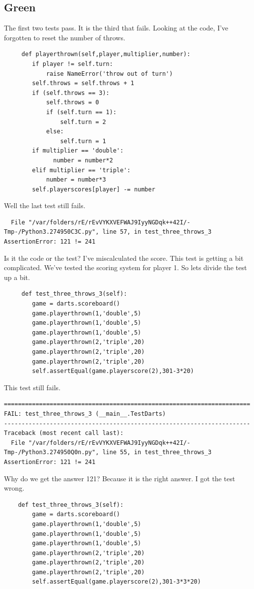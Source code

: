 \documentclass{paper}
\begin{document}
\subsection{Green}
The first two tests pass. It is the third that fails. Looking at the
code, I've forgotten to reset the number of throws.
\begin{lstlisting}
     def playerthrown(self,player,multiplier,number):
        if player != self.turn:
            raise NameError('throw out of turn')
        self.throws = self.throws + 1
        if (self.throws == 3):
            self.throws = 0
            if (self.turn == 1):
                self.turn = 2
            else:
                self.turn = 1
        if multiplier == 'double':
              number = number*2
        elif multiplier == 'triple':
            number = number*3
        self.playerscores[player] -= number
\end{lstlisting}
Well the last test still fails.
\begin{verbatim}
  File "/var/folders/rE/rEvVYKXVEFWAJ9IyyNGDqk++42I/-Tmp-/Python3.274950C3C.py", line 57, in test_three_throws_3
AssertionError: 121 != 241
\end{verbatim}
Is it the code or the test? I've miscalculated the score.
This test is getting a bit complicated. We've tested the scoring
system for  player 1. So lets divide the test up a bit.

\begin{lstlisting}
     def test_three_throws_3(self):
        game = darts.scoreboard()
        game.playerthrown(1,'double',5)
        game.playerthrown(1,'double',5)
        game.playerthrown(1,'double',5)
        game.playerthrown(2,'triple',20)
        game.playerthrown(2,'triple',20)
        game.playerthrown(2,'triple',20)
        self.assertEqual(game.playerscore(2),301-3*20)
\end{lstlisting}

This test still fails.
\begin{verbatim}
======================================================================
FAIL: test_three_throws_3 (__main__.TestDarts)
----------------------------------------------------------------------
Traceback (most recent call last):
  File "/var/folders/rE/rEvVYKXVEFWAJ9IyyNGDqk++42I/-Tmp-/Python3.274950Q0n.py", line 55, in test_three_throws_3
AssertionError: 121 != 241
\end{verbatim}
Why do we get the answer 121? Because it is the right answer. I got
the test wrong.
\begin{lstlisting}
    def test_three_throws_3(self):
        game = darts.scoreboard()
        game.playerthrown(1,'double',5)
        game.playerthrown(1,'double',5)
        game.playerthrown(1,'double',5)
        game.playerthrown(2,'triple',20)
        game.playerthrown(2,'triple',20)
        game.playerthrown(2,'triple',20)
        self.assertEqual(game.playerscore(2),301-3*3*20)
\end{lstlisting}
\end{document}
